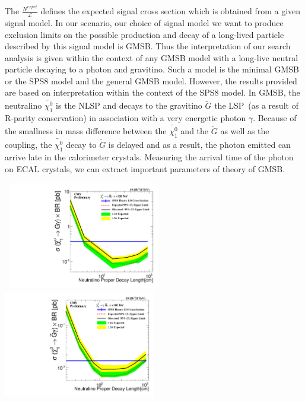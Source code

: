 \par
The $\frac{N^{expet}}{\mathscr{L}}$ defines the expected signal cross section which is obtained from a given signal model. In our scenario, our choice of signal model we  want to produce exclusion limits on the possible production and decay of a long-lived particle described by this signal model is GMSB.
Thus the interpretation of our search analysis is given within the context of any GMSB model with a long-live neutral particle decaying to a photon and gravitino. Such a model is the minimal GMSB or the SPS8 model and the general GMSB model. However, the results provided are based on interpretation within the context of the SPS8 model.
In GMSB, the neutralino $\tilde{\chi^{0}_{1}}$ is the NLSP and decays to the gravitino $\tilde{G}$ the LSP~(as a result of R-parity conservation) in association with a very energetic photon $\gamma$. Because of the smallness in mass difference between the  $\tilde{\chi^{0}_{1}}$ and the $\tilde{G}$ as well as the coupling, the $\tilde{\chi^{0}_{1}}$ decay to $\tilde{G}$ is delayed and as a result, the photon emitted can arrive late in the calorimeter crystals.  Measuring the arrival time of the photon on ECAL crystals, we can extract important parameters of  theory of GMSB.




\begin{center}
\centering
\mbox{
\includegraphics[height=0.5\textwidth,width=0.5\textwidth]{THESISPLOTS/100TeV_Neutralino_CrossSecTimesBR_Uplimit.pdf}
\includegraphics[height=0.5\textwidth, width=0.5\textwidth]{THESISPLOTS/Neutralino_CrossSecTimesBR_Uplimit.pdf} }
\label{fig:SPS8_Ctau_Ulimit}
\end{center}


